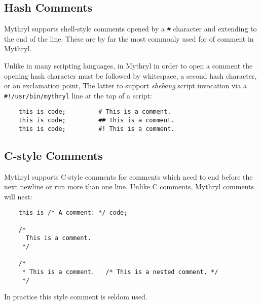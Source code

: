 
\subsection{Hash Comments}
\label{section:ref:comments:hash}

Mythryl supports shell-style comments opened by a {\tt #} character 
and extending to the end of the line.  These are by far the most 
commonly used for of comment in Mythryl.

Unlike in many scripting languages, in Mythryl in order to open a 
comment the opening hash character must be followed by whitespace, 
a second hash character, or an exclamation point,  The latter to 
support {\it shebang} script invocation via a {\tt #!/usr/bin/mythryl} 
line at the top of a script:

\begin{verbatim}
    this is code;         # This is a comment.
    this is code;         ## This is a comment.
    this is code;         #! This is a comment.
\end{verbatim}

\cutend*

\subsection{C-style Comments}
\label{section:ref:comments:c}

Mythryl supports C-style comments for comments which 
need to end before the next newline or run more than 
one line.  Unlike C comments, Mythryl comments will 
nest:

\begin{verbatim}
    this is /* A comment: */ code;

    /*
      This is a comment.
     */

    /*
     * This is a comment.   /* This is a nested comment. */
     */
\end{verbatim}

In practice this style comment is seldom used.

\cutend*

